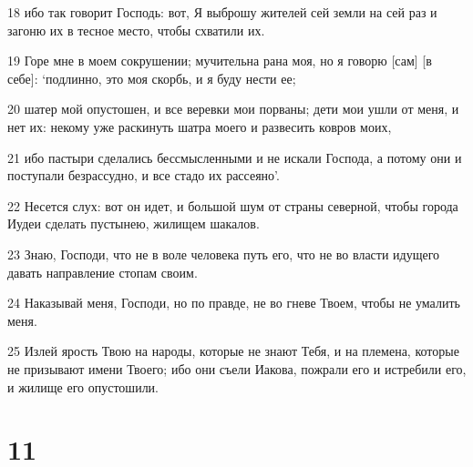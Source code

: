 \par 18 ибо так говорит Господь: вот, Я выброшу жителей сей земли на сей раз и загоню их в тесное место, чтобы схватили их.
\par 19 Горе мне в моем сокрушении; мучительна рана моя, но я говорю [сам] [в себе]: `подлинно, это моя скорбь, и я буду нести ее;
\par 20 шатер мой опустошен, и все веревки мои порваны; дети мои ушли от меня, и нет их: некому уже раскинуть шатра моего и развесить ковров моих,
\par 21 ибо пастыри сделались бессмысленными и не искали Господа, а потому они и поступали безрассудно, и все стадо их рассеяно'.
\par 22 Несется слух: вот он идет, и большой шум от страны северной, чтобы города Иудеи сделать пустынею, жилищем шакалов.
\par 23 Знаю, Господи, что не в воле человека путь его, что не во власти идущего давать направление стопам своим.
\par 24 Наказывай меня, Господи, но по правде, не во гневе Твоем, чтобы не умалить меня.
\par 25 Излей ярость Твою на народы, которые не знают Тебя, и на племена, которые не призывают имени Твоего; ибо они съели Иакова, пожрали его и истребили его, и жилище его опустошили.

\chapter{11}

